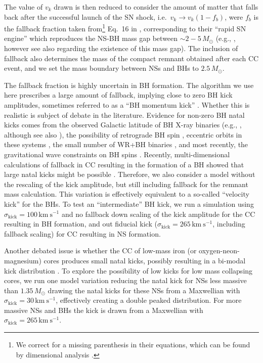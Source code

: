 \documentclass{aa}
\begin{document}
The value of $v_k$ drawn is then reduced to consider the amount of matter that 
falls back after the successful launch of the SN shock,
i.e.~$v_k \rightarrow v_k(1-f_b)$, were $f_b$ is the fallback
fraction taken from\footnote{We correct for a missing parenthesis in
  their equations, which can be found by dimensional analysis \citep[][]{belczynski:17}.} Eq.~16 in \cite{fryer:12}, corresponding to their
``rapid SN engine'' which reproduces the NS-BH mass gap between
$\sim2-5\,M_\odot$ (e.g., \citealt{farr:11}, however see also \citealt{wyrzykowski:16}
regarding the existence of this mass gap). 
The inclusion of fallback
also determines the mass of the compact remnant obtained after each
CC event, and we set the mass boundary between NSs and BHs to
$2.5\,M_\odot$.

The fallback fraction is highly uncertain in BH formation. The algorithm we use
here prescribes a large amount of fallback, implying close to zero
BH kick amplitudes, sometimes referred to as a ``BH momentum kick'' \citep[][]{belczynski:08,stevenson:17}. Whether
this is realistic is subject of debate in the literature. Evidence for
non-zero BH natal kicks comes from the observed
Galactic latitude of BH X-ray binaries
(e.g., \citealt{fragos:09,repetto:12,repetto:15,repetto:17}, although
see also \citealt{mandel:16}), the
possibility of retrograde BH spin \citep[e.g.,][]{morningstar:14}, eccentric orbits in these systems
\citep[e.g.][]{remillard:06}, the
small number of WR+BH binaries \citep[e.g.,][]{dray:05}, and most
recently, the gravitational wave constraints on
BH spins \citep[e.g.,][]{oshaughnessy:17,wysocki:18}. Recently,
multi-dimensional calculations of fallback in CC resulting in the
formation of a BH showed that large natal kicks might be possible \citep[][]{chan:18}. Therefore, we
also consider a model without the rescaling of the kick amplitude, but still
including fallback for the remnant mass calculation. This variation is
effectively equivalent to a so-called ``velocity kick'' for the
BHs. To test an ``intermediate'' BH kick, we run a simulation using
$\sigma_\mathrm{kick}=100\,\mathrm{km\ s^{-1}}$ and no fallback
down scaling of the kick amplitude for
the CC resulting in BH formation, and out fiducial kick
($\sigma_\mathrm{kick}=265\,\mathrm{km\ s^{-1}}$, including fallback scaling)
for CC resulting in NS formation.

Another debated issue is whether the CC of low-mass iron
(or oxygen-neon-magnesium) cores produces small natal
kicks, possibly resulting in a bi-modal kick distribution
\citep[][]{katz:75, arzoumanian:02, pfahl:02,
  podsiadlowski:04, martin:09, knigge:11, wongwathanarat:13,
  beniamini:16, tauris:17, verbunt:17, verbunt:17b}. To
explore the possibility of low kicks for low mass collapsing cores, we
run one model variation reducing the natal kick for NSs less massive
than $1.35\,M_\odot$ \citep[][]{schwab:10,knigge:11} drawing
the natal kicks for these NSs from a Maxwellian with
$\sigma_\mathrm{kick}=30\,\mathrm{km\ s^{-1}}$, effectively creating a
double peaked distribution. For more massive NSs and BHs the kick is drawn from a
Maxwellian with $\sigma_\mathrm{kick}=265\,\mathrm{km\ s^{-1}}$.
\end{document}
